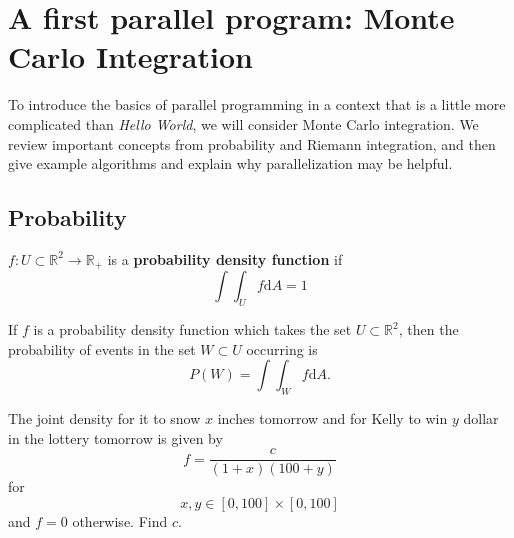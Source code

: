 \begin{enumerate}






\end{enumerate}

\section{A first parallel program: Monte Carlo Integration}

To introduce the basics of parallel programming in a context that is a little more complicated than {\it Hello World}, we will consider Monte Carlo integration. We review important concepts from probability and Riemann integration, and then give example algorithms and explain why parallelization may be helpful.

\subsection{Probability}

\begin{definition} $f:U\subset \mathbb{R}^2 \rightarrow \mathbb{R}_+$ is a {\bf probability density function} if
$$ \int\int_U f \mathrm{d}A =1$$
\end{definition}

\begin{definition} If $f$ is a probability density function which takes the set $U\subset\mathbb{R}^2$, then the probability of events in the set $W\subset U$ occurring is
$$P(W)=\int\int_W f \mathrm{d}A.$$
\end{definition}

\begin{example} The joint density for it to snow $x$ inches tomorrow and for Kelly to win $y$ dollar in the lottery tomorrow is given by
$$f=\frac{c}{(1+x)(100+y)}$$
for
$$x,y\in [0,100]\times[0,100]$$
and $f=0$ otherwise. Find $c$.
\end{example}
 

